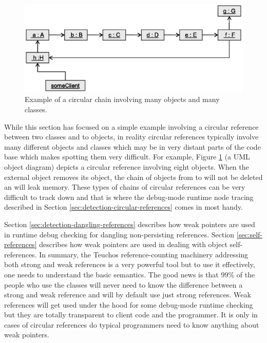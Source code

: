 \documentclass[pdf,ps2pdf,11pt]{SANDreport}
\begin{document}
{\bsinglespace
\begin{figure}
\begin{center}
\includegraphics*[angle=0,scale=0.65]{CircularChain}
\end{center}
\caption{
\label{fig:CircularChain}
Example of a circular chain involving many objects and many classes.}
\end{figure}
\esinglespace}


While this section has focused on a simple example involving a circular
reference between two classes and to objects, in reality circular
references typically involve many different objects and classes which
may be in very distant parts of the code base which makes spotting
them very difficult.  For example, Figure {}\ref{fig:CircularChain} (a
UML object diagram) depicts a circular reference involving eight
objects.  When the external {} object removes its
{} object, the chain of objects from {} to
{} will not be deleted an will leak memory.  These types of
chains of circular references can be very difficult to track down and
that is where the debug-mode runtime node tracing described in Section
{}\ref{sec:detection-circular-references} comes in most handy.

Section {}\ref{sec:detection-dangling-references} describes how weak
pointers are used in runtime debug checking for dangling
non-persisting references.  Section {}\ref{sec:self-references}
describes how weak pointers are used in dealing with object
self-references.  In summary, the Teuchos reference-counting machinery
addressing both strong and weak references is a very powerful tool but
to use it effectively, one needs to understand the basic semantics.
The good news is that 99\% of the people who use the classes
{} will never need to know the difference between a
strong and weak reference and will by default use just strong
references.  Weak references will get used under the hood for some
debug-mode runtime checking but they are totally transparent to client
code and the programmer.  It is only in cases of circular references
do typical programmers need to know anything about weak pointers.
\end{document}
